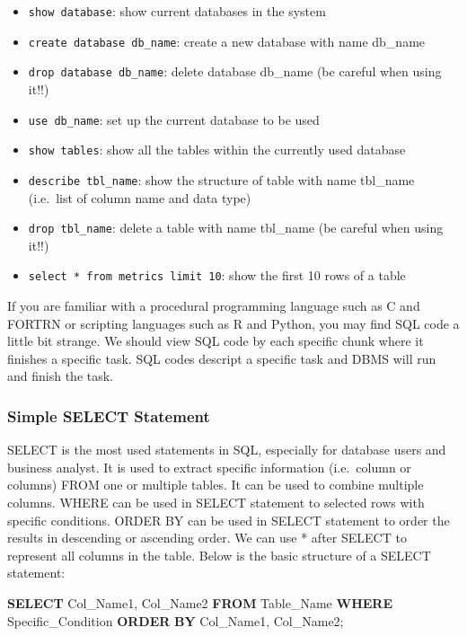 \documentclass[
]{article}
\newenvironment{Shaded}{\begin{snugshade}}{\end{snugshade}}
\newcommand{\KeywordTok}[1]{\textcolor[rgb]{0.13,0.29,0.53}{\textbf{#1}}}
\newcommand{\NormalTok}[1]{#1}
\providecommand{\tightlist}{%
  \setlength{\itemsep}{0pt}\setlength{\parskip}{0pt}}
\begin{document}
\begin{itemize}
\tightlist
\item
  \texttt{show\ database}: show current databases in the system
\item
  \texttt{create\ database\ db\_name}: create a new database with name
  db\_name
\item
  \texttt{drop\ database\ db\_name}: delete database db\_name (be
  careful when using it!!)
\item
  \texttt{use\ db\_name}: set up the current database to be used
\item
  \texttt{show\ tables}: show all the tables within the currently used
  database
\item
  \texttt{describe\ tbl\_name}: show the structure of table with name
  tbl\_name (i.e.~list of column name and data type)
\item
  \texttt{drop\ tbl\_name}: delete a table with name tbl\_name (be
  careful when using it!!)
\item
  \texttt{select\ *\ from\ metrics\ limit\ 10}: show the first 10 rows
  of a table
\end{itemize}

If you are familiar with a procedural programming language such as C and
FORTRN or scripting languages such as R and Python, you may find SQL
code a little bit strange. We should view SQL code by each specific
chunk where it finishes a specific task. SQL codes descript a specific
task and DBMS will run and finish the task.

\hypertarget{simple-select-statement}{%
\subsubsection{Simple SELECT Statement}\label{simple-select-statement}}

SELECT is the most used statements in SQL, especially for database users
and business analyst. It is used to extract specific information
(i.e.~column or columns) FROM one or multiple tables. It can be used to
combine multiple columns. WHERE can be used in SELECT statement to
selected rows with specific conditions. ORDER BY can be used in SELECT
statement to order the results in descending or ascending order. We can
use * after SELECT to represent all columns in the table. Below is the
basic structure of a SELECT statement:

\begin{Shaded}
\begin{Highlighting}[]
\KeywordTok{SELECT}\NormalTok{ Col_Name1, Col_Name2}
\KeywordTok{FROM}\NormalTok{ Table_Name}
\KeywordTok{WHERE}\NormalTok{ Specific_Condition}
\KeywordTok{ORDER} \KeywordTok{BY}\NormalTok{ Col_Name1, Col_Name2;}
\end{Highlighting}
\end{Shaded}
\end{document}
